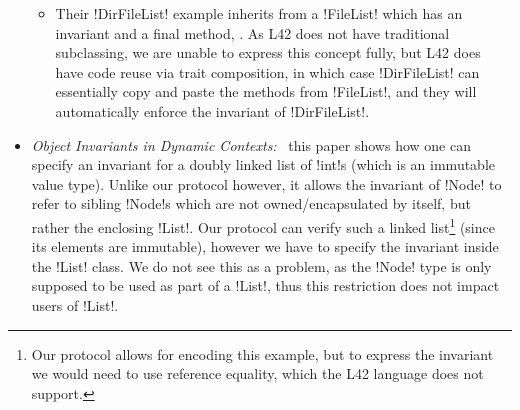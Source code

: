\begin{itemize}
\begin{itemize}
		\item Their \Q!DirFileList! example inherits from a \Q!FileList! which has an invariant\IODel{,} and a final method,  . As L42 does not have traditional subclassing, we are unable to express this concept fully, but L42 does have code reuse via trait composition, in which case \Q!DirFileList! can essentially copy and paste the methods from \Q!FileList!, and they will automatically enforce the invariant of \Q!DirFileList!. %
	\end{itemize}

	\item \emph{Object Invariants in Dynamic Contexts:}~\cite{DBLP:conf/ecoop/LeinoM04} this paper shows how one can specify an invariant for a doubly linked list of \Q!int!s (which is an immutable value type). Unlike our protocol however, it allows the invariant of \Q!Node! to refer to sibling \Q!Node!s which are not owned/encapsulated by itself, but rather the enclosing \Q!List!. Our protocol can verify such a linked list\footnote{%
Our protocol allows for encoding this example, but
to express the invariant we would need to 
use reference equality, which the L42 language does not support.
} (since its elements are immutable), however we have to specify the invariant inside the \Q!List! class. We do not see this as a problem, as the \Q!Node! type is only supposed to be used as part of a \Q!List!, thus this restriction does not impact users of \Q!List!.
	

\end{itemize}
